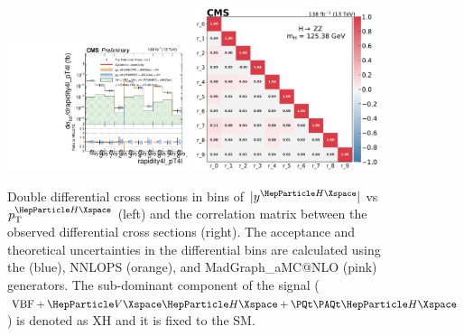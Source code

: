 \begin{center}
	\begin{figure}[!htb]
		\centering
		\includegraphics[width=0.48\textwidth]{Images/H4L/doublediff/rapidity4l_pT4l_unfoldwith_SM_125_logscale_asimov.pdf}
		\includegraphics[width=0.48\textwidth]{Images/H4L/correlations/corr_rapidity4l_pT4l_v3.pdf}\\
		\caption{
			Double differential cross sections in bins of $\abs{y^{\PH}}$ vs $\pt^{\PH}$ (left) and the correlation matrix between the observed differential cross sections (right).
			The acceptance and theoretical uncertainties in the differential bins are calculated using the \POWHEG (blue), NNLOPS (orange), and MadGraph\_aMC@NLO (pink) generators.
			The sub-dominant component of the signal ($\VBF + \VH + \ttH$) is denoted as XH and it is fixed to the SM.
			\label{fig:fidYHPTH}}
	\end{figure}
\end{center}

\clearpage

